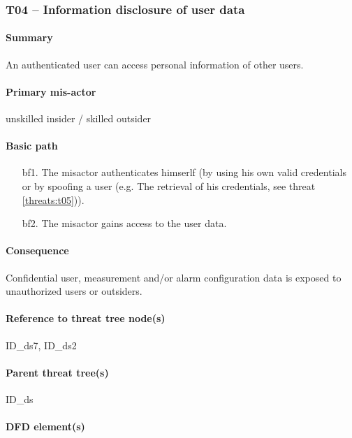 \subsubsection{T04 -- Information disclosure of user data}

\paragraph{Summary}

\npar An authenticated user can access personal information of other users.

\paragraph{Primary mis-actor}

\npar unskilled insider / skilled outsider

\paragraph{Basic path}

\begin{enumerate}
	\item[bf1.] The misactor authenticates himserlf (by using his own valid
	credentials or by spoofing a user (e.g. The retrieval of his credentials, see
	threat \ref{threats:t05})).
    \item[bf2.] The misactor gains access to the user data.
\end{enumerate}

\paragraph{Consequence}

\npar Confidential user, measurement and/or alarm configuration data is exposed
to unauthorized users or outsiders.

\paragraph{Reference to threat tree node(s)}

ID\_ds7, ID\_ds2

\paragraph{Parent threat tree(s)}

ID\_ds

\paragraph{DFD element(s)}

